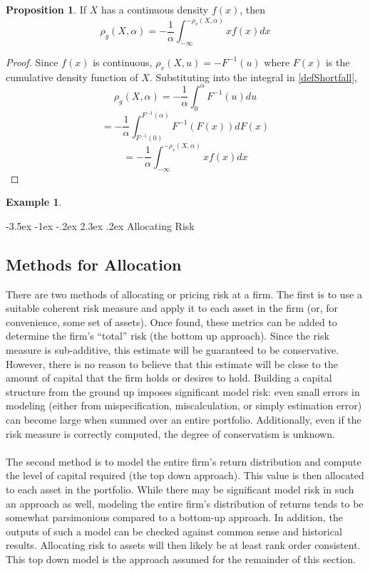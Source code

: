 \documentclass[12pt]{article}
\makeatletter
\theoremstyle{definition}
\newtheorem{example}{Example}
\renewcommand\section{\@startsection{section}{1}{\z@}%
                                  {-3.5ex \@plus -1ex \@minus -.2ex}%
                                  {2.3ex \@plus.2ex}%
                                  {\normalfont\large\bfseries}}
\newtheorem{prop}{Proposition}
\makeatother
\begin{document}
\begin{prop}
If \(X\) has a continuous density \(f(x)\), then \[\rho_g(X, \alpha)=-\frac{1}{\alpha}\int_{-\infty} ^ {-\rho_v(X, \alpha)} x f(x) dx\]

\end{prop}

\begin{proof}
Since \(f(x)\) is continuous, \(\rho_v(X, u)=-F^{-1}(u)\) where \(F(x)\) is the cumulative density function of \(X\).  Substituting into the integral in \ref{defShortfall}, 
\[\rho_g (X, \alpha)=-\frac{1}{\alpha}\int_0 ^ \alpha F^{-1}(u) du\]
\[=-\frac{1}{\alpha}\int_{F^{-1}(0)} ^ {F^{-1}(\alpha)} F^{-1}(F(x)) dF(x)\]
\[=-\frac{1}{\alpha}\int_{-\infty} ^ {-\rho_v(X, \alpha)} x f(x) dx\]

\end{proof}

\begin{example}


\end{example}

\section{Allocating Risk}
\subsection{Methods for Allocation}
There are two methods of allocating or pricing risk at a firm.  The first is to use a suitable coherent risk measure and apply it to each asset in the firm (or, for convenience, some set of assets).  Once found, these metrics can be added to determine the firm's ``total'' risk (the bottom up approach).  Since the risk measure is sub-additive, this estimate will be guaranteed to be conservative.  However, there is no reason to believe that this estimate will be close to the amount of capital that the firm holds or desires to hold.  Building a capital structure from the ground up imposes significant model risk:  even small errors in modeling (either from mispecification, miscalculation, or simply estimation error) can become large when summed over an entire portfolio.  Additionally, even if the risk measure is correctly computed, the degree of conservatism is unknown.
\\
\\
The second method is to model the entire firm's return distribution and compute the level of capital required (the top down approach).  This value is then allocated to each asset in the portfolio.  While there may be significant model risk in such an approach as well, modeling the entire firm's distribution of returns tends to be somewhat parsimonious compared to a bottom-up approach.  In addition, the outputs of such a model can be checked against common sense and historical results.  Allocating risk to assets will then likely be at least rank order consistent.  This top down model is the approach assumed for the remainder of this section. 
\end{document}
